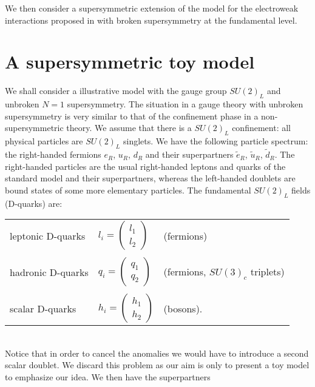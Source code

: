 \documentclass[a4paper,12pt]{article}
\begin{document}
We then consider a supersymmetric extension of the model for the
electroweak interactions proposed in \cite{CF} with broken
supersymmetry at the fundamental level.

\section{A supersymmetric toy model}

We shall consider a illustrative model with the gauge group $SU(2)_L$ and
unbroken $\!N\!=\!1\!$ supersymmetry.  The situation in a gauge theory
with unbroken supersymmetry is very similar to that of the confinement
phase in a non-supersymmetric theory. We assume that there is a
$SU(2)_L$ confinement: all physical particles are $SU(2)_L$ singlets.
We have the following particle spectrum: the right-handed fermions
$e_R$, $u_R$, $d_R$ and their superpartners $\tilde{e}_R$,
$\tilde{u}_R$, $\tilde{d}_R$. The right-handed particles are the usual
right-handed leptons and quarks of the standard model and their
superpartners, whereas the left-handed doublets are bound states of
some more elementary particles. The fundamental $SU(2)_L$ fields
(D-quarks) are:
\\
\begin{tabular}{lll}
leptonic D-quarks & $l_i=  \left(\begin{array}{c} l_1 \\ l_2 \end{array}
\right )$  &  (fermions)  \\
& & \\
 hadronic  D-quarks   & $q_i= \left(\begin{array}{c}q_1 \\ q_2\end{array}
\right )$   &  (fermions, $SU(3)_c$ triplets) \\ 
& & \\
scalar D-quarks  &  $h_i= \left(
  \begin{array}{c}
  h_1 \\ h_2
  \end{array}
\right )$ & (bosons).
\end{tabular}
\\
Notice that in order to cancel the anomalies we would have to
introduce a second scalar doublet. We discard this problem as our aim
is only to present a toy model to emphasize our idea. We then have the
superpartners
\\
\end{document}
